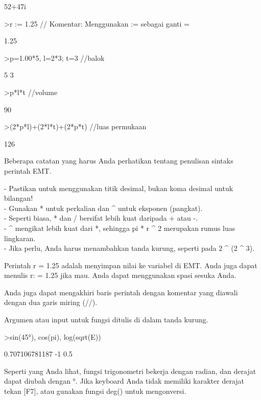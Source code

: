 \documentclass[12pt,Times new roman,letterpaper]{book}
\begin{document}
\begin{eulernootebook}
\begin{eulercomment}
\begin{eulercomment}
\begin{euleroutput}
  52+47i
\end{euleroutput}
\begin{eulerprompt}
>r := 1.25 // Komentar: Menggunakan  := sebagai ganti =
\end{eulerprompt}
\begin{euleroutput}
  1.25
\end{euleroutput}
\begin{eulerprompt}
>p=1.00*5, l=2*3; t=3 //balok
\end{eulerprompt}
\begin{euleroutput}
  5
  3
\end{euleroutput}
\begin{eulerprompt}
>p*l*t //volume
\end{eulerprompt}
\begin{euleroutput}
  90
\end{euleroutput}
\begin{eulerprompt}
>(2*p*l)+(2*l*t)+(2*p*t) //luas permukaan
\end{eulerprompt}
\begin{euleroutput}
  126
\end{euleroutput}
\eulersubheading{}
\begin{eulercomment}
Beberapa catatan yang harus Anda perhatikan tentang penulisan sintaks
perintah EMT.

- Pastikan untuk menggunakan titik desimal, bukan koma desimal untuk
bilangan!\\
- Gunakan * untuk perkalian dan \textasciicircum{} untuk eksponen (pangkat).\\
- Seperti biasa, * dan / bersifat lebih kuat daripada + atau -.\\
- \textasciicircum{} mengikat lebih kuat dari *, sehingga pi * r \textasciicircum{} 2 merupakan rumus
luas lingkaran.\\
- Jika perlu, Anda harus menambahkan tanda kurung, seperti pada 2 \textasciicircum{} (2
\textasciicircum{} 3).

Perintah r = 1.25 adalah menyimpan nilai ke variabel di EMT. Anda juga
dapat menulis r: = 1.25 jika mau. Anda dapat menggunakan spasi sesuka
Anda.

Anda juga dapat mengakhiri baris perintah dengan komentar yang diawali
dengan dua garis miring (//).

Argumen atau input untuk fungsi ditulis di dalam tanda kurung.
\end{eulercomment}
\begin{eulerprompt}
>sin(45°), cos(pi), log(sqrt(E))
\end{eulerprompt}
\begin{euleroutput}
  0.707106781187
  -1
  0.5
\end{euleroutput}
\begin{eulercomment}
Seperti yang Anda lihat, fungsi trigonometri bekerja dengan radian, dan derajat
dapat diubah dengan °. Jika keyboard Anda tidak memiliki karakter derajat tekan
[F7], atau gunakan fungsi deg() untuk mengonversi.


\end{eulercomment}
\end{eulercomment}
\end{eulercomment}
\end{eulernootebook}
\end{document}
